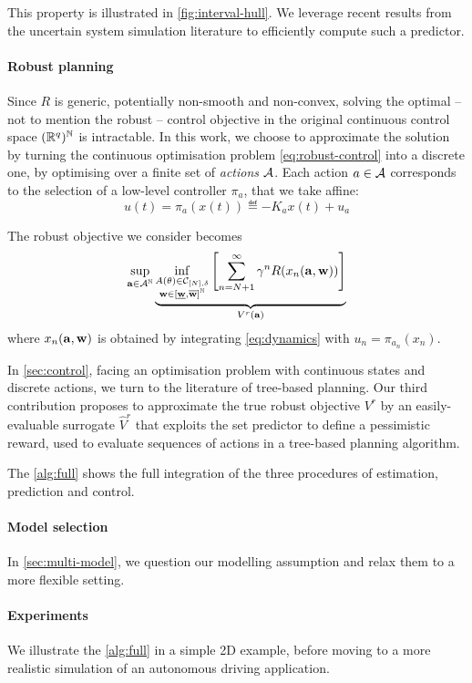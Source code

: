 \documentclass{article}
\begin{document}
This property is illustrated in \autoref{fig:interval-hull}. We leverage recent results from the uncertain system simulation literature to efficiently compute such a predictor.

\paragraph{Robust planning}

Since $R$ is generic, potentially non-smooth and non-convex, solving the optimal -- not to mention the robust -- control objective in the original continuous control space $(\mathbb{R}^q)^{\mathbb{N}}$ is intractable.
In this work, we choose to approximate the solution by turning the continuous optimisation problem \eqref{eq:robust-control} into a discrete one, by optimising over a finite set of \emph{actions} $\mathcal{A}$. Each action $a\in\mathcal{A}$ corresponds to the selection of a low-level controller $\pi_a$, that we take affine:
\[u(t) = \pi_a(x(t)) \eqdef -K_a x(t) + u_a\]

The robust objective we consider becomes 
\begin{equation}
\label{eq:robust-control-disc}
\sup_{\mathbf{a}\in{\mathcal{A}}^{\mathbb{N}}} \underbrace{\inf_{\substack{A(\theta) \in \mathcal{C}_{[N],\delta} \\ \mathbf{w}\in[\underline{\mathbf{w}},\overline{\mathbf{w}}]^{\mathbb{N}}}} \left[\sum_{n=N+1}^\infty \gamma^n R(x_n(\mathbf{a},\mathbf{w}))\right]}_{V^r(\mathbf{a})}
\end{equation}
where $x_n(\mathbf{a}, \mathbf{w})$ is obtained by integrating \eqref{eq:dynamics} with $u_n = \pi_{a_n}(x_n)$.

In \autoref{sec:control}, facing an optimisation problem with continuous states and discrete actions, we turn to the literature of tree-based planning. Our third contribution proposes to approximate the true robust objective ${V}^r$ by an easily-evaluable surrogate $\hat{V}^r$ that exploits the set predictor to define a pessimistic reward, used to evaluate sequences of actions in a tree-based planning algorithm.

The \autoref{alg:full} shows the full integration of the three procedures of estimation, prediction and control.

\paragraph{Model selection} In \autoref{sec:multi-model}, we question our modelling assumption and relax them to a more flexible setting. 

\paragraph{Experiments} We illustrate the \autoref{alg:full} in a simple 2D example, before moving to a more realistic simulation of an autonomous driving application.
\end{document}
